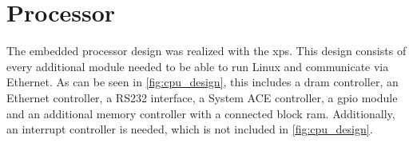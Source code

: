 \documentclass[12pt,a4paper,parskip=full,abstract=true,BCOR=12mm,twoside,open=right]{scrreprt}
\begin{document}

\section{Processor}
\label{sec:processor}

The embedded processor design was realized with the \gls{xps}. This
design consists of every additional module needed to be
able to run Linux and communicate via Ethernet. As can be seen in
\cref{fig:cpu_design}, this includes a \gls{dram} controller, an
Ethernet controller, a RS232 interface, a System ACE controller,
a \gls{gpio} module and an additional memory controller with a connected
block \gls{ram}. Additionally, an interrupt controller is needed, which is
not included in \cref{fig:cpu_design}.
\end{document}
